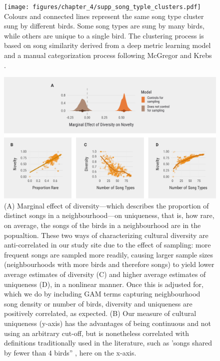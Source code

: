 \documentclass[9pt, onecolumn, twoside, lineno]{gsajnl}
\begin{document}
\begin{figure}[tbp]
    \centering
    \texttt{[image: figures/chapter\_4/supp\_song\_typle\_clusters.pdf]}
    {
Colours and connected lines represent the same song type cluster sung by different birds. Some song types are sung by many birds, while others are unique to a single bird. The clustering process is based on song similarity derived from a deep metric learning model and a manual categorization process following McGregor and Krebs \autocite{mcgregor1982b}.
    }
    \label{fig:supp_song_typle_clusters}
\end{figure}


\begin{figure}[tbp]
    \centering
    \includegraphics[width=\linewidth]{figures/chapter_4/supp_song_sampling.pdf}
    {
        (A) Marginal effect of diversity---which describes the proportion of distinct songs in a neighbourhood---on uniqueness, that is, how rare, on average, the songs of the birds in a neighbourhood are in the popualtion. These two ways of characterizing cultural diversity are anti-correlated in our study site due to the effect of sampling: more frequent songs are sampled more readily, causing larger sample sizes (neighbourhoods with more birds and therefore songs) to yield lower average estimates of diversity (C) and higher average estimates of uniqueness (D), in a nonlinear manner. Once this is adjusted for, which we do by including GAM terms capturing neighbourhood song density or number of birds, diversity and uniqueness are positively correlated, as expected. (B) Our measure of cultural uniqueness (y-axis) has the advantages of being continuous and not using an arbitrary cut-off, but is nonetheless correlated with definitions traditionally used in the literature, such as 'songs shared by fewer than 4 birds” \autocite{mcgregor1982b}, here on the x-axis.}
    \label{fig:supp_song_sampling}
\end{figure}
\end{document}
